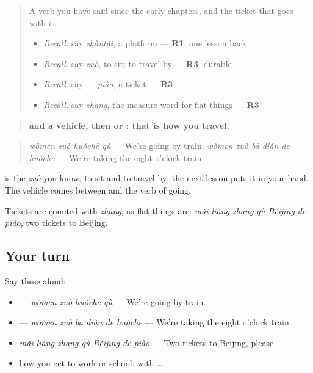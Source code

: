 \label{lesson:ZH-C284-ticket}



\begin{quote}
A verb you have said since the early chapters, and the ticket that goes with it.

\begin{itemize}
\raggedright
  \item \emph{Recall:} say \emph{zhàntái}, a platform — \textbf{R1}, one lesson back
  \item \emph{Recall:} say \emph{zuò}, to sit; to travel by — \textbf{R3}, durable
  \item \emph{Recall:} say  — \emph{piào}, a ticket — \textbf{R3}
  \item \emph{Recall:} say \emph{zhāng}, the measure word for flat things — \textbf{R3}
\end{itemize}
\end{quote}

\begin{grammarlens}[title={Grammar Lens: \zh{坐} and a vehicle, then \zh{去}}]
\begin{quote}
\textbf{ and a vehicle, then  or : that is how you travel.}
\end{quote}

\begin{quote}
\textbf{} \emph{wǒmen zuò huǒchē qù} — We're going by train. \textbf{} \emph{wǒmen zuò bā diǎn de huǒchē} — We're taking the eight o'clock train.
\end{quote}

 is the \emph{zuò} you know, to sit and to travel by; the next lesson puts it in your hand. The vehicle comes between  and the verb of going.

Tickets are counted with \emph{zhāng}, as flat things are: \emph{mǎi liǎng zhāng qù Běijīng de piào}, two tickets to Beijing.
\end{grammarlens}

\subsection*{Your turn}
Say these aloud:

\begin{itemize}
\raggedright
  \item {} — \emph{wǒmen zuò huǒchē qù} — We're going by train.
  \item {} — \emph{wǒmen zuò bā diǎn de huǒchē} — We're taking the eight o'clock train.
  \item \emph{mǎi liǎng zhāng qù Běijīng de piào} — Two tickets to Beijing, please.
  \item how you get to work or school, with  … 
\end{itemize}

